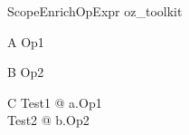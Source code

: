 \begin{zsection}
  \SECTION ScopeEnrichOpExpr \parents oz\_toolkit
\end{zsection}

\begin{class}{A}
  Op1 \sdef [x? : \nat]
\end{class}

\begin{class}{B}
  Op2 
\end{class}

\begin{class}{C}
  Test1 \sdef [a : A] @ a.Op1\\
  Test2 \sdef [b : B] @ b.Op2
\end{class}
